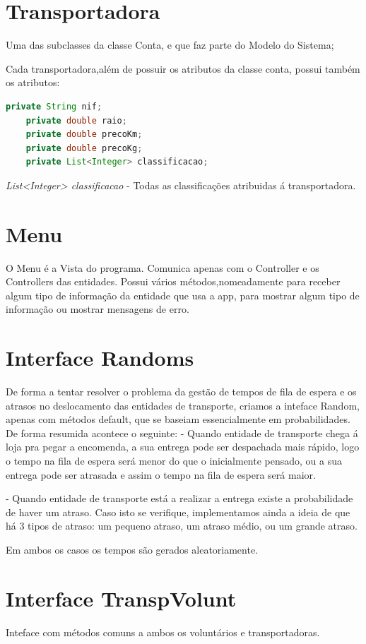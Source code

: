 \documentclass[a4paper]{report}
\begin{document}
	
	\section{Transportadora}
	Uma das subclasses da classe Conta, e que faz parte do Modelo do Sistema;
	
	Cada transportadora,além de possuir os atributos da classe conta, possui também os atributos:
	\begin{lstlisting}[language=Java]
	private String nif;
	private double raio;
	private double precoKm;
	private double precoKg;
	private List<Integer> classificacao;
	\end{lstlisting}
	\textit{List<Integer> classificacao} - Todas as classificações atribuidas á transportadora.
	
	\section{Menu}
	O Menu é a Vista do programa. Comunica apenas com o Controller e os Controllers das entidades.
	Possui vários métodos,nomeadamente para receber algum tipo de informação da entidade que usa a app, para mostrar algum tipo de informação ou mostrar mensagens de erro.
	
	\section{Interface Randoms}
	De forma a tentar resolver o problema da gestão de tempos de fila de espera e os atrasos no deslocamento das entidades de transporte, criamos a inteface Random, apenas com métodos default, que se baseiam essencialmente em probabilidades.
	De forma resumida acontece o seguinte:
	 - Quando entidade de transporte chega á loja pra pegar a encomenda, a sua entrega pode ser despachada mais rápido, logo o tempo na fila de espera será menor do que o inicialmente pensado, ou a sua entrega pode ser atrasada e assim o tempo na fila de espera será maior.
	 
	 - Quando entidade de transporte está a realizar a entrega existe a probabilidade de haver um atraso. Caso isto se verifique, implementamos ainda a ideia de que há 3 tipos de atraso: um pequeno atraso, um atraso médio, ou um grande atraso.
	 
	 Em ambos os casos os tempos são gerados aleatoriamente. 
	 
	  \section{Interface TranspVolunt}
	 Inteface com métodos comuns a ambos os voluntários e transportadoras.
	 
\end{document}
